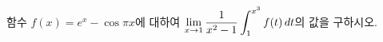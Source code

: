 \hspace*{2mm}\begin{minipage}[t]{\dimexpr\linewidth-2mm\relax}\vspace{0pt}
함수 $f(x)=e^x-\cos\pi x$에 대하여 $\displaystyle\lim_{x\to 1}\dfrac{1}{x^2-1}\int_{1}^{x^3}f(t)\mkern3mu dt$의 값을 구하시오.\end{minipage}
